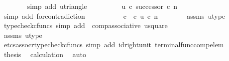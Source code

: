 \begin{isabellebody}
\ \ \ \ \ \ \isamarkupfalse%
\ {\isacharparenleft}{\kern0pt}simp\ add{\isacharcolon}{\kern0pt}\ u{\isacharunderscore}{\kern0pt}triangle{\isacharparenright}{\kern0pt}\isanewline
\ \ \ \ \isamarkupfalse%
\ \isamarkupfalse%
\ {\isachardoublequoteopen}{\isachardot}{\kern0pt}{\isachardot}{\kern0pt}{\isachardot}{\kern0pt}\ {\isacharequal}{\kern0pt}\ u\ {\isasymcirc}\isactrlsub c\ successor\ {\isasymcirc}\isactrlsub c\ n{\isachardoublequoteclose}\isanewline
\ \ \ \ \ \ \isamarkupfalse%
\ {\isacharparenleft}{\kern0pt}simp\ add{\isacharcolon}{\kern0pt}\ for{\isacharunderscore}{\kern0pt}contradiction{\isacharparenright}{\kern0pt}\isanewline
\ \ \ \ \isamarkupfalse%
\ \isamarkupfalse%
\ {\isachardoublequoteopen}{\isachardot}{\kern0pt}{\isachardot}{\kern0pt}{\isachardot}{\kern0pt}\ {\isacharequal}{\kern0pt}\ {\isacharparenleft}{\kern0pt}{\isasymf}\ {\isasymcirc}\isactrlsub c\ {\isasymbeta}\isactrlbsub {\isasymOmega}\isactrlesub {\isacharparenright}{\kern0pt}\ {\isasymcirc}\isactrlsub c\ u\ {\isasymcirc}\isactrlsub c\ n{\isachardoublequoteclose}\isanewline
\ \ \ \ \ \ \isamarkupfalse%
\ assms\ u{\isacharunderscore}{\kern0pt}type\ \isamarkupfalse%
\ {\isacharparenleft}{\kern0pt}typecheck{\isacharunderscore}{\kern0pt}cfuncs{\isacharcomma}{\kern0pt}\ simp\ add{\isacharcolon}{\kern0pt}\ \ comp{\isacharunderscore}{\kern0pt}associative{}\ u{\isacharunderscore}{\kern0pt}square{\isacharparenright}{\kern0pt}\isanewline
\ \ \ \ \isamarkupfalse%
\ \isamarkupfalse%
\ {\isachardoublequoteopen}{\isachardot}{\kern0pt}{\isachardot}{\kern0pt}{\isachardot}{\kern0pt}\ {\isacharequal}{\kern0pt}\ {\isasymf}{\isachardoublequoteclose}\isanewline
\ \ \ \ \ \ \isamarkupfalse%
\ assms\ u{\isacharunderscore}{\kern0pt}type\ \isamarkupfalse%
\ {\isacharparenleft}{\kern0pt}etcs{\isacharunderscore}{\kern0pt}assocr{\isacharcomma}{\kern0pt}typecheck{\isacharunderscore}{\kern0pt}cfuncs{\isacharcomma}{\kern0pt}\ simp\ add{\isacharcolon}{\kern0pt}\ id{\isacharunderscore}{\kern0pt}right{\isacharunderscore}{\kern0pt}unit{}\ terminal{\isacharunderscore}{\kern0pt}func{\isacharunderscore}{\kern0pt}comp{\isacharunderscore}{\kern0pt}elem{\isacharparenright}{\kern0pt}\isanewline
\ \ \ \ \isamarkupfalse%
\ \isamarkupfalse%
\ {\isacharquery}{\kern0pt}thesis\ \isamarkupfalse%
\ calculation\ \isamarkupfalse%
\ auto\isanewline
\ \ \isamarkupfalse%

\end{isabellebody}
